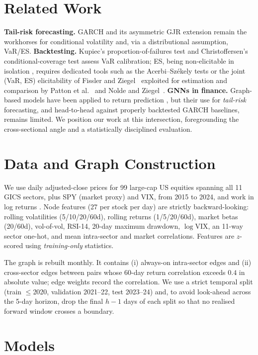 \documentclass{llncs}
\newcommand{\nStocks}{99}
\newcommand{\nSectors}{11}
\begin{document}
\section{Related Work}
\textbf{Tail-risk forecasting.} GARCH \citep{bollerslev1986} and its asymmetric
GJR extension \citep{glosten1993} remain the workhorses for conditional
volatility and, via a distributional assumption, VaR/ES. \textbf{Backtesting.}
Kupiec's proportion-of-failures test \citep{kupiec1995} and Christoffersen's
conditional-coverage test \citep{christoffersen1998} assess VaR calibration;
ES, being non-elicitable in isolation \citep{gneiting2011}, requires dedicated
tools such as the Acerbi--Sz\'ekely tests \citep{acerbi2014} or the joint
(VaR, ES) elicitability of Fissler and Ziegel~\citep{fissler2016} exploited
for estimation and comparison by Patton et al.~\citep{patton2019} and Nolde
and Ziegel~\citep{nolde2017}. \textbf{GNNs in
finance.} Graph-based models have been applied to return prediction
\citep{matsunaga2019}, but their use for \emph{tail-risk} forecasting, and
head-to-head against properly backtested GARCH baselines, remains limited. We
position our work at this intersection, foregrounding the cross-sectional angle
and a statistically disciplined evaluation.

\section{Data and Graph Construction}
We use daily adjusted-close prices for \nStocks{} large-cap US equities spanning
all \nSectors{} GICS sectors, plus SPY (market proxy) and VIX, from 2015 to 2024,
and work in log returns \citep{cont2001}. Node features (27 per stock per day)
are strictly backward-looking: rolling volatilities (5/10/20/60d), rolling
returns (1/5/20/60d), market betas (20/60d), vol-of-vol, RSI-14, 20-day maximum
drawdown, $\log$VIX, an 11-way sector one-hot, and mean intra-sector and market
correlations. Features are $z$-scored using \emph{training-only} statistics.

The graph is rebuilt monthly. It contains (i) always-on intra-sector edges and
(ii) cross-sector edges between pairs whose 60-day return correlation exceeds
$0.4$ in absolute value; edge weights record the correlation. We use a strict
temporal split (train $\le$2020, validation 2021--22, test 2023--24) and, to
avoid look-ahead across the 5-day horizon, drop the final $h-1$ days of each
split so that no realised forward window crosses a boundary.

\section{Models}
\end{document}
